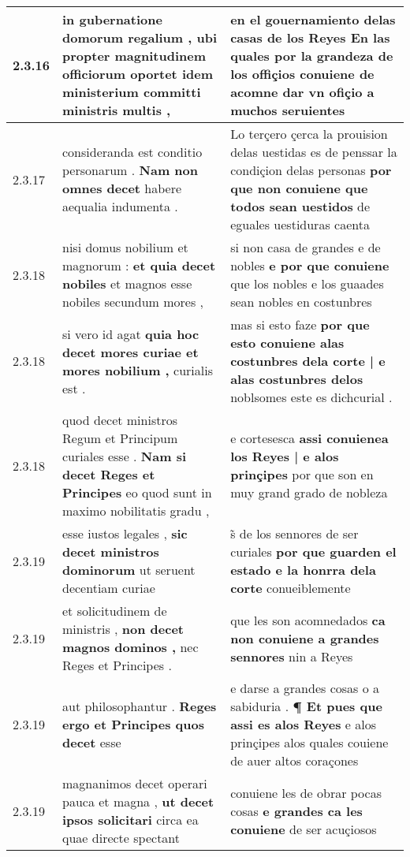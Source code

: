 \begin{tabular}{|p{1cm}|p{6.5cm}|p{6.5cm}|}
2.3.16 & in gubernatione domorum regalium , \textbf{ ubi propter magnitudinem officiorum oportet } idem ministerium committi ministris multis , & en el gouernamiento delas casas de los Reyes \textbf{ En las quales por la grandeza de los offiçios conuiene de } acomne dar vn ofiçio a muchos seruientes \\\hline
2.3.17 & consideranda est conditio personarum . \textbf{ Nam non omnes decet } habere aequalia indumenta . & Lo terçero çerca la prouision delas uestidas es de penssar la condiçion delas personas \textbf{ por que non conuiene que todos sean uestidos } de eguales uestiduras caenta \\\hline
2.3.18 & nisi domus nobilium et magnorum : \textbf{ et quia decet nobiles } et magnos esse nobiles secundum mores , & si non casa de grandes e de nobles \textbf{ e por que conuiene } que los nobles e los guaades sean nobles en costunbres \\\hline
2.3.18 & si vero id agat \textbf{ quia hoc decet mores curiae et mores nobilium , } curialis est . & mas si esto faze \textbf{ por que esto conuiene alas costunbres dela corte | e alas costunbres delos } noblsomes este es dichcurial . \\\hline
2.3.18 & quod decet ministros Regum et Principum curiales esse . \textbf{ Nam si decet Reges et Principes } eo quod sunt in maximo nobilitatis gradu , & e cortesesca \textbf{ assi conuienea los Reyes | e alos prinçipes } por que son en muy grand grado de nobleza \\\hline
2.3.19 & esse iustos legales , \textbf{ sic decet ministros dominorum } ut seruent decentiam curiae & s̃ de los sennores de ser curiales \textbf{ por que guarden el estado e la honrra dela corte } conueiblemente \\\hline
2.3.19 & et solicitudinem de ministris , \textbf{ non decet magnos dominos , } nec Reges et Principes . & que les son acomnedados \textbf{ ca non conuiene a grandes sennores } nin a Reyes \\\hline
2.3.19 & aut philosophantur . \textbf{ Reges ergo et Principes quos decet } esse & e darse a grandes cosas o a sabiduria . \textbf{ ¶ Et pues que assi es alos Reyes } e alos prinçipes alos quales couiene de auer altos coraçones \\\hline
2.3.19 & magnanimos decet operari pauca et magna , \textbf{ ut decet ipsos solicitari } circa ea quae directe spectant & conuiene les de obrar pocas cosas \textbf{ e grandes ca les conuiene } de ser acuçiosos \\\hline

\end{tabular}
